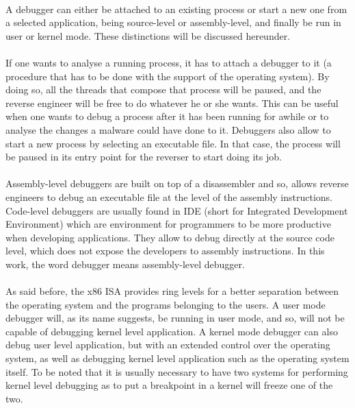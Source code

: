 \paragraph{}
A debugger can either be attached to an existing process or start a new one from a selected application, being source-level or assembly-level, and finally be run in user or kernel mode. These distinctions will be discussed hereunder.

\paragraph{}
If one wants to analyse a running process, it has to attach a debugger to it (a procedure that has to be done with the support of the operating system). By doing so, all the threads that compose that process will be paused, and the reverse engineer will be free to do whatever he or she wants. This can be useful when one wants to debug a process after it has been running for awhile or to analyse the changes a malware could have done to it. Debuggers also allow to start a new process by selecting an executable file. In that case, the process will be paused in its entry point for the reverser to start doing its job.

\paragraph{}
Assembly-level debuggers are built on top of a disassembler and so, allows reverse engineers to debug an executable file at the level of the assembly instructions. Code-level debuggers are usually found in IDE (short for Integrated Development Environment) which are environment for programmers to be more productive when developing applications. They allow to debug directly at the source code level, which does not expose the developers to assembly instructions. In this work, the word debugger means assembly-level debugger.

\paragraph{}
As said before, the x86 ISA provides ring levels for a better separation between the operating system and the programs belonging to the users. A user mode debugger will, as its name suggests, be running in user mode, and so, will not be capable of debugging kernel level application. A kernel mode debugger can also debug user level application, but with an extended control over the operating system, as well as debugging kernel level application such as the operating system itself. To be noted that it is usually necessary to have two systems for performing kernel level debugging as to put a breakpoint in a kernel will freeze one of the two. 

